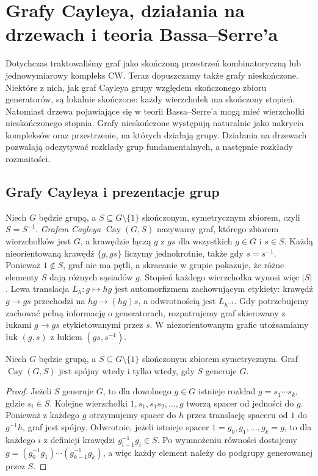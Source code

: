 \chapter{Grafy Cayleya, działania na drzewach i teoria Bassa--Serre'a}
\label{ch:tg-bass-serre}

Dotychczas traktowaliśmy graf jako skończoną przestrzeń kombinatoryczną lub
jednowymiarowy kompleks CW. Teraz dopuszczamy także grafy nieskończone. Niektóre z nich,
jak graf Cayleya grupy względem skończonego zbioru generatorów,
są lokalnie skończone: każdy wierzchołek ma skończony stopień.
Natomiast drzewa pojawiające się w teorii Bassa--Serre'a mogą
mieć wierzchołki nieskończonego stopnia. Grafy nieskończone
występują naturalnie jako nakrycia kompleksów oraz przestrzenie,
na których działają grupy. Działania na drzewach pozwalają
odczytywać rozkłady grup fundamentalnych, a następnie rozkłady rozmaitości.

\section{Grafy Cayleya i prezentacje grup}
\label{sec:tg-cayley}

\begin{definicja}
Niech $G$ będzie grupą, a $S\subseteq G\setminus\{1\}$
skończonym, symetrycznym zbiorem, czyli $S=S^{-1}$.
\emph{Grafem Cayleya} $\operatorname{Cay}(G,S)$ nazywamy graf,
którego zbiorem wierzchołków jest $G$, a krawędzie łączą
$g$ z $gs$ dla wszystkich $g\in G$ i $s\in S$.
Każdą nieorientowaną krawędź $\{g,gs\}$ liczymy jednokrotnie,
także gdy $s=s^{-1}$. Ponieważ $1\notin S$,
graf nie ma pętli, a skracanie w grupie pokazuje,
że różne elementy $S$ dają różnych sąsiadów $g$.
Stopień każdego wierzchołka wynosi więc $|S|$.
Lewa translacja $L_h:g\mapsto hg$ jest automorfizmem
zachowującym etykiety: krawędź $g\to gs$ przechodzi
na $hg\to(hg)s$, a odwrotnością jest $L_{h^{-1}}$.
Gdy potrzebujemy zachować pełną informację o generatorach,
rozpatrujemy graf skierowany z łukami $g\to gs$
etykietowanymi przez $s$. W niezorientowanym grafie
utożsamiamy łuk $(g,s)$ z łukiem $(gs,s^{-1})$.
\end{definicja}

\begin{stwierdzenie}
Niech $G$ będzie grupą, a $S\subseteq G\setminus\{1\}$
skończonym zbiorem symetrycznym. Graf $\operatorname{Cay}(G,S)$
jest spójny wtedy i tylko wtedy, gdy $S$ generuje $G$.
\end{stwierdzenie}
\begin{proof}
Jeżeli $S$ generuje $G$, to dla dowolnego $g\in G$ istnieje
rozkład $g=s_1\cdots s_k$, gdzie $s_i\in S$. Kolejne
wierzchołki $1,s_1,s_1s_2,\ldots,g$ tworzą spacer od
jedności do $g$. Ponieważ z każdego $g$ otrzymujemy
spacer do $h$ przez translację spaceru od $1$ do
$g^{-1}h$, graf jest spójny. Odwrotnie, jeżeli istnieje
spacer $1=g_0,g_1,\ldots,g_k=g$, to dla każdego $i$
z definicji krawędzi $g_{i-1}^{-1}g_i\in S$.
Po wymnożeniu równości dostajemy
$g=(g_0^{-1}g_1)\cdots(g_{k-1}^{-1}g_k)$, a więc
każdy element należy do podgrupy generowanej przez $S$.
\end{proof}

